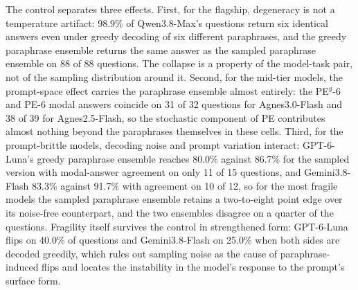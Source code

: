 The control separates three effects. First, for the flagship, degeneracy is not a temperature artifact: 98.9\% of Qwen3.8-Max's questions return six identical answers even under greedy decoding of six different paraphrases, and the greedy paraphrase ensemble returns the same answer as the sampled paraphrase ensemble on 88 of 88 questions. The collapse is a property of the model-task pair, not of the sampling distribution around it. Second, for the mid-tier models, the prompt-space effect carries the paraphrase ensemble almost entirely: the PE$^{g}$-6 and PE-6 modal answers coincide on 31 of 32 questions for Agnes3.0-Flash and 38 of 39 for Agnes2.5-Flash, so the stochastic component of PE contributes almost nothing beyond the paraphrases themselves in these cells. Third, for the prompt-brittle models, decoding noise and prompt variation interact: GPT-6-Luna's greedy paraphrase ensemble reaches 80.0\% against 86.7\% for the sampled version with modal-answer agreement on only 11 of 15 questions, and Gemini3.8-Flash 83.3\% against 91.7\% with agreement on 10 of 12, so for the most fragile models the sampled paraphrase ensemble retains a two-to-eight point edge over its noise-free counterpart, and the two ensembles disagree on a quarter of the questions. Fragility itself survives the control in strengthened form: GPT-6-Luna flips on 40.0\% of questions and Gemini3.8-Flash on 25.0\% when both sides are decoded greedily, which rules out sampling noise as the cause of paraphrase-induced flips and locates the instability in the model's response to the prompt's surface form.
